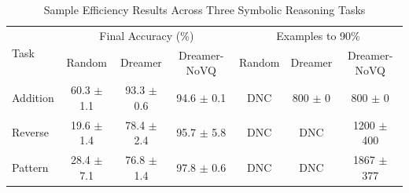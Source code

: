 \begin{table}[h]
\centering
\caption{Sample Efficiency Results Across Three Symbolic Reasoning Tasks}
\label{tab:results}
\begin{tabular}{l|ccc|ccc}
\hline
\multirow{2}{*}{Task} & \multicolumn{3}{c|}{Final Accuracy (\%)} & \multicolumn{3}{c}{Examples to 90\%} \\
& Random & Dreamer & Dreamer-NoVQ & Random & Dreamer & Dreamer-NoVQ \\
\hline
Addition & 60.3 $\pm$ 1.1 & 93.3 $\pm$ 0.6 & 94.6 $\pm$ 0.1 & DNC & 800 $\pm$ 0 & 800 $\pm$ 0 \\
Reverse & 19.6 $\pm$ 1.4 & 78.4 $\pm$ 2.4 & 95.7 $\pm$ 5.8 & DNC & DNC & 1200 $\pm$ 400 \\
Pattern & 28.4 $\pm$ 7.1 & 76.8 $\pm$ 1.4 & 97.8 $\pm$ 0.6 & DNC & DNC & 1867 $\pm$ 377 \\
\hline
\end{tabular}
\end{table}
